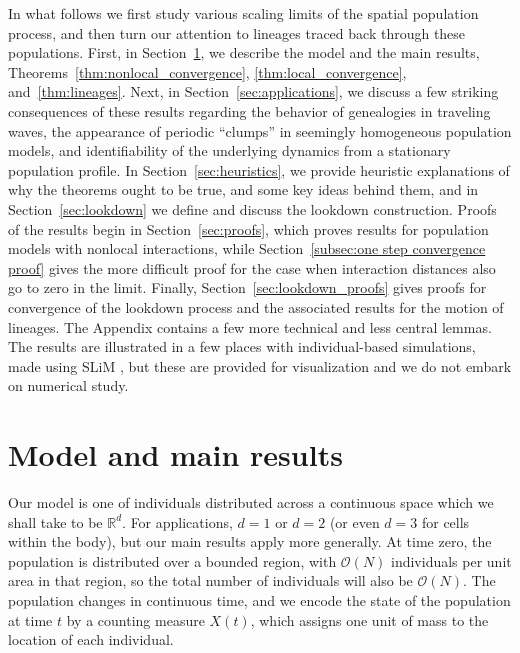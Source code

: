 \documentclass[12pt]{article}
\newcommand{\IR}{\mathbb R}
\newcommand{\bigO}{\mathcal{O}}
\numberwithin{equation}{section}
\begin{document}
In what follows we first study various scaling limits of the spatial population process,
and then turn our attention to lineages traced back through these populations.
First, in Section~\ref{sec: Model and main results},
we describe the model and the main results,
Theorems~\ref{thm:nonlocal_convergence}, \ref{thm:local_convergence}, and~\ref{thm:lineages}.
Next, in Section~\ref{sec:applications}, we discuss a few striking consequences of these results
regarding the behavior of genealogies in traveling waves,
the appearance of periodic ``clumps'' in seemingly homogeneous population models,
and identifiability of the underlying dynamics from a stationary population profile.
In Section~\ref{sec:heuristics}, we provide heuristic explanations
of why the theorems ought to be true,
and some key ideas behind them,
and in Section~\ref{sec:lookdown} we define and discuss the lookdown construction.
Proofs of the results begin in Section~\ref{sec:proofs},
which proves results for population models with nonlocal interactions,
while Section~\ref{subsec:one step convergence proof} gives the more difficult proof
for the case when interaction distances also go to zero in the limit.
Finally, Section~\ref{sec:lookdown_proofs} gives proofs for convergence of the lookdown process
and the associated results for the motion of lineages.
The Appendix contains a few more technical and less central lemmas.
The results are illustrated in a few places with individual-based simulations,
made using SLiM \citep{haller_slim_2019},
but these are provided for visualization and we do not embark on numerical study.


\section{Model and main results}
    \label{sec: Model and main results}

Our model is one of individuals distributed across a continuous space 
which we shall take to be $\IR^d$. 
For applications, $d=1$ or $d=2$
(or even $d=3$ for cells within the body),
but our main results apply more generally.
At time zero, the population is distributed over a bounded region, with 
$\bigO(N)$ individuals per unit area in that region,
so the total number of individuals will also be $\bigO(N)$.
The population changes in continuous time, and
we encode the state of the population at time $t$ by a counting measure $X(t)$,
which assigns one unit of mass to the location of each individual.
\end{document}
